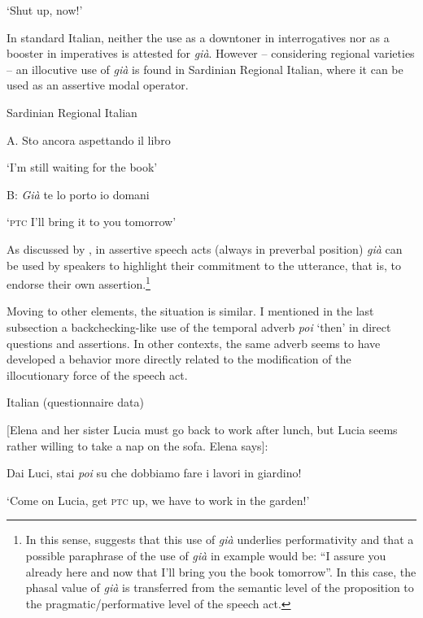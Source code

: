 \glt ‘Shut up, now!’
    \z %

In standard Italian, neither the use as a downtoner in interrogatives nor as a booster in imperatives is attested for \textit{già}. However – considering regional varieties – an illocutive use of \textit{già} is found in Sardinian Regional Italian, where it can be used as an assertive modal operator.

\ea%
    \label{ex:key:103}

         Sardinian Regional Italian \citep[120]{Calaresu2015}

A.   Sto ancora aspettando il libro

\glt ‘I’m still waiting for the book’

B:   \textit{Già} te lo porto io domani

\glt ‘\textsc{ptc} I’ll bring it to you tomorrow’
    \z %

As discussed by \citet{Calaresu2015}, in assertive speech acts (always in preverbal position) \textit{già} can be used by speakers to highlight their commitment to the utterance, that is, to endorse their own assertion.\footnote{In this sense, \citet{Calaresu2015} suggests that this use of \textit{già} underlies performativity and that a possible paraphrase of the use of \textit{già} in example  would be: “I assure you already here and now that I’ll bring you the book tomorrow”. In this case, the phasal value of \textit{già} is transferred from the semantic level of the proposition to the pragmatic/performative level of the speech act.}

Moving to other elements, the situation is similar. I mentioned in the last subsection a backchecking-like use of the temporal adverb \textit{poi} ‘then’ in direct questions and assertions. In other contexts, the same adverb seems to have developed a behavior more directly related to the modification of the illocutionary force of the speech act.

\ea%
    \label{ex:key:104}

          Italian (questionnaire data)

[Elena and her sister Lucia must go back to work after lunch, but Lucia seems rather willing to take a nap on the sofa. Elena says]:

   Dai Luci, stai \textit{poi} su che dobbiamo fare i lavori in giardino!

\glt ‘Come on Lucia, get \textsc{ptc} up, we have to work in the garden!’
    \z %

